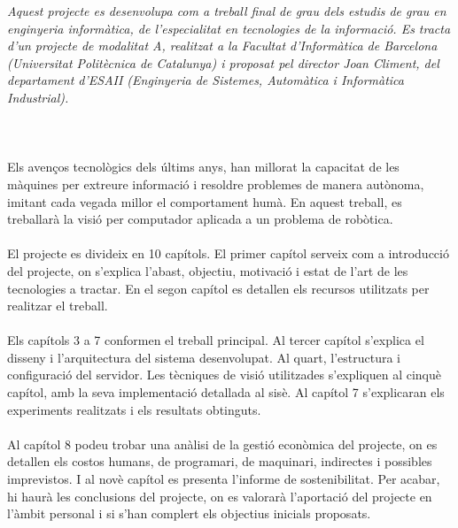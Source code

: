 \textit{Aquest projecte es desenvolupa com a treball final de grau dels estudis de grau en enginyeria informàtica, de l'especialitat en tecnologies de la informació.
Es tracta d'un projecte de modalitat A, realitzat a la Facultat d'Informàtica de Barcelona (Universitat Politècnica de Catalunya) i proposat pel director Joan Climent,
del departament d'ESAII (Enginyeria de Sistemes, Automàtica i Informàtica Industrial).}\\\\\\\\
Els avenços tecnològics dels últims anys, han millorat la capacitat de les màquines per extreure informació i resoldre problemes de manera autònoma, imitant cada vegada millor
el comportament humà. En aquest treball, es treballarà la visió per computador aplicada a un problema de robòtica.\\\\
El projecte es divideix en 10 capítols. El primer capítol serveix com a introducció del projecte, on s'explica l'abast, objectiu, motivació i estat de l'art de les tecnologies a tractar.
En el segon capítol es detallen els recursos utilitzats per realitzar el treball.\\\\
Els capítols 3 a 7 conformen el treball principal. Al tercer capítol s'explica el disseny i l'arquitectura del sistema desenvolupat. Al quart, l'estructura i configuració del servidor. Les tècniques de visió
utilitzades s'expliquen al cinquè capítol, amb la seva implementació detallada al sisè. Al capítol 7 s'explicaran els experiments realitzats i els resultats obtinguts.\\\\
Al capítol 8 podeu trobar una anàlisi de la gestió econòmica del projecte, on es detallen els costos humans, de programari, de maquinari, indirectes i possibles imprevistos. I al novè capítol
es presenta l'informe de sostenibilitat. Per acabar, hi haurà les conclusions del projecte, on es valorarà l'aportació del projecte en l'àmbit personal i si s'han complert els objectius inicials proposats.

